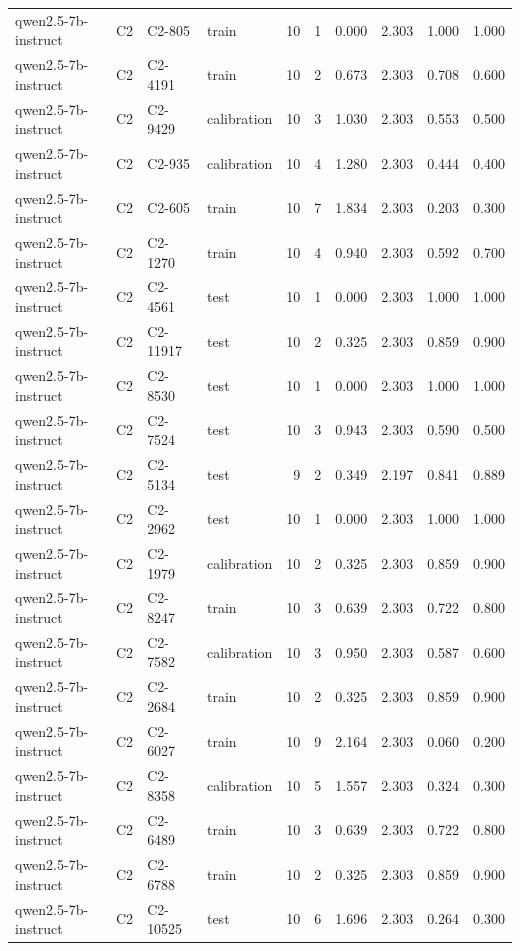 \begin{table}
\begin{tabular}{llllrrrrrr}
qwen2.5-7b-instruct & C2 & C2-805 & train & 10 & 1 & 0.000 & 2.303 & 1.000 & 1.000 \\
qwen2.5-7b-instruct & C2 & C2-4191 & train & 10 & 2 & 0.673 & 2.303 & 0.708 & 0.600 \\
qwen2.5-7b-instruct & C2 & C2-9429 & calibration & 10 & 3 & 1.030 & 2.303 & 0.553 & 0.500 \\
qwen2.5-7b-instruct & C2 & C2-935 & calibration & 10 & 4 & 1.280 & 2.303 & 0.444 & 0.400 \\
qwen2.5-7b-instruct & C2 & C2-605 & train & 10 & 7 & 1.834 & 2.303 & 0.203 & 0.300 \\
qwen2.5-7b-instruct & C2 & C2-1270 & train & 10 & 4 & 0.940 & 2.303 & 0.592 & 0.700 \\
qwen2.5-7b-instruct & C2 & C2-4561 & test & 10 & 1 & 0.000 & 2.303 & 1.000 & 1.000 \\
qwen2.5-7b-instruct & C2 & C2-11917 & test & 10 & 2 & 0.325 & 2.303 & 0.859 & 0.900 \\
qwen2.5-7b-instruct & C2 & C2-8530 & test & 10 & 1 & 0.000 & 2.303 & 1.000 & 1.000 \\
qwen2.5-7b-instruct & C2 & C2-7524 & test & 10 & 3 & 0.943 & 2.303 & 0.590 & 0.500 \\
qwen2.5-7b-instruct & C2 & C2-5134 & test & 9 & 2 & 0.349 & 2.197 & 0.841 & 0.889 \\
qwen2.5-7b-instruct & C2 & C2-2962 & test & 10 & 1 & 0.000 & 2.303 & 1.000 & 1.000 \\
qwen2.5-7b-instruct & C2 & C2-1979 & calibration & 10 & 2 & 0.325 & 2.303 & 0.859 & 0.900 \\
qwen2.5-7b-instruct & C2 & C2-8247 & train & 10 & 3 & 0.639 & 2.303 & 0.722 & 0.800 \\
qwen2.5-7b-instruct & C2 & C2-7582 & calibration & 10 & 3 & 0.950 & 2.303 & 0.587 & 0.600 \\
qwen2.5-7b-instruct & C2 & C2-2684 & train & 10 & 2 & 0.325 & 2.303 & 0.859 & 0.900 \\
qwen2.5-7b-instruct & C2 & C2-6027 & train & 10 & 9 & 2.164 & 2.303 & 0.060 & 0.200 \\
qwen2.5-7b-instruct & C2 & C2-8358 & calibration & 10 & 5 & 1.557 & 2.303 & 0.324 & 0.300 \\
qwen2.5-7b-instruct & C2 & C2-6489 & train & 10 & 3 & 0.639 & 2.303 & 0.722 & 0.800 \\
qwen2.5-7b-instruct & C2 & C2-6788 & train & 10 & 2 & 0.325 & 2.303 & 0.859 & 0.900 \\
qwen2.5-7b-instruct & C2 & C2-10525 & test & 10 & 6 & 1.696 & 2.303 & 0.264 & 0.300 \\

\end{tabular}
\end{table}
